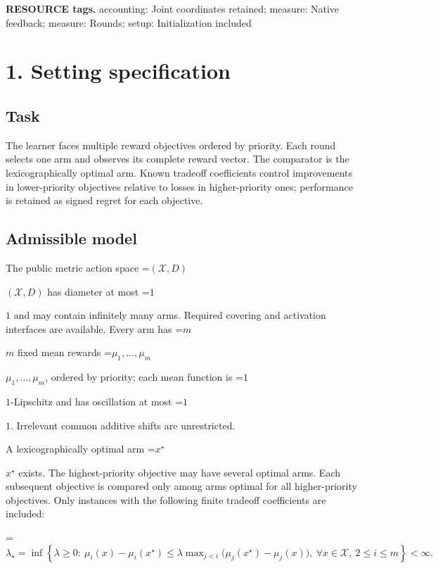 \documentclass[10pt,a4paper]{article}
\newcommand{\AtlasMath}[1]{\par\begingroup\centering\setbox0=\hbox{$\displaystyle #1$}\ifdim\wd0>1.4\linewidth\typeout{ATLAS WIDE FORMULA: \the\wd0}\fi\ifdim\wd0>\linewidth\resizebox{\linewidth}{!}{\box0}\else\box0\fi\par\endgroup}
\newcommand{\AtlasInlineMath}[1]{\begingroup\setbox0=\hbox{$#1$}\ifdim\wd0>.4\linewidth\endgroup\AtlasMath{#1}\else\endgroup$#1$\fi}
\begin{document}
\textbf{RESOURCE tags.} accounting: Joint coordinates retained; measure: Native feedback; measure: Rounds; setup: Initialization included



\section{1. Setting specification}


\subsection{Task}


The learner faces multiple reward objectives ordered by priority. Each round selects one arm and observes its complete reward vector. The comparator is the lexicographically optimal arm. Known tradeoff coefficients control improvements in lower-priority objectives relative to losses in higher-priority ones; performance is retained as signed regret for each objective.



\subsection{Admissible model}


The public metric action space \AtlasInlineMath{(\mathcal{X},D)} has diameter at most \AtlasInlineMath{1} and may contain infinitely many arms. Required covering and activation interfaces are available. Every arm has \AtlasInlineMath{m} fixed mean rewards \AtlasInlineMath{\mu_1,\ldots,\mu_m}, ordered by priority; each mean function is \AtlasInlineMath{1}-Lipschitz and has oscillation at most \AtlasInlineMath{1}. Irrelevant common additive shifts are unrestricted.



A lexicographically optimal arm \AtlasInlineMath{x^\star} exists. The highest-priority objective may have several optimal arms. Each subsequent objective is compared only among arms optimal for all higher-priority objectives. Only instances with the following finite tradeoff coefficients are included:




\AtlasMath{\lambda_\star=\inf\!\left\{\lambda\ge0:\ \mu_i(x)-\mu_i(x^\star)\le\lambda\max_{j<i}\bigl(\mu_j(x^\star)-\mu_j(x)\bigr),\ \forall x\in\mathcal{X},\ 2\le i\le m\right\}<\infty.}
\end{document}

